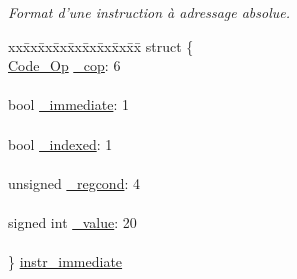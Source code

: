 \begin{DoxyCompactItemize}
\begin{tabbing}
\end{tabbing}\begin{DoxyCompactList}\small\item\em \-Format d'une instruction à adressage absolue. \end{DoxyCompactList}\item 
\begin{tabbing}
xx\=xx\=xx\=xx\=xx\=xx\=xx\=xx\=xx\=\kill
struct \{\\
\>\hyperlink{instruction_8h_a5ead9d7413d75b14e895c945daa82de6}{Code\_Op} \hyperlink{union_instruction_a2eef4c29da07a7afefa510530aeabe8b}{\_cop}: 6\\
\>\\
\>bool \hyperlink{union_instruction_ae8f0aed9ccc5cc06e0689f32c409787d}{\_immediate}: 1\\
\>\\
\>bool \hyperlink{union_instruction_a49ff74dcae74d84b5fce96090bcbcd14}{\_indexed}: 1\\
\>\\
\>unsigned \hyperlink{union_instruction_aacc0d299ebbd857ec008b3c9e2ae2cd0}{\_regcond}: 4\\
\>\\
\>signed int \hyperlink{union_instruction_ab38556b2069bd4af524024e6045fc711}{\_value}: 20\\
\>\\
\} \hyperlink{union_instruction_ad71dbb5583d6c21a4e562be0b378ff8a}{instr\_immediate}\\


\end{tabbing}
\end{DoxyCompactItemize}
